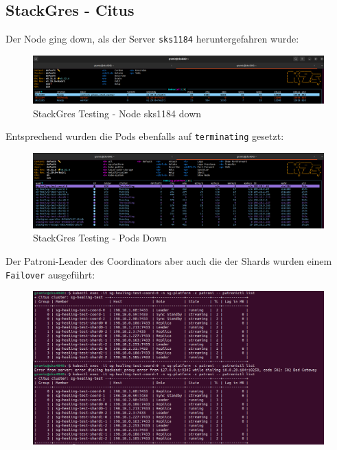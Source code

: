 
\begin{flushleft}
    \subsection{StackGres - Citus}
    \label{subsec:appendix_testing_stackgres_citus}
    Der Node ging down, als der Server \texttt{sks1184} heruntergefahren wurde:
    \begin{figure}[H]
        \centering
        \includegraphics[width=1\linewidth]{source/appendix/evaluation_testing/stackgres_node_sks1184_down}
        \caption{StackGres Testing - Node sks1184 down}
        \label{fig:stackgres_node_sks1184_down}
    \end{figure}
    Entsprechend wurden die Pods ebenfalls auf \texttt{terminating} gesetzt:
    \begin{figure}[H]
        \centering
        \includegraphics[width=1\linewidth]{source/appendix/evaluation_testing/stackgres_citus_testing_node_down}
        \caption{StackGres Testing - Pods Down}
        \label{fig:stackgres_citus_testing_node_down}
    \end{figure}
    Der Patroni-Leader des Coordinators aber auch die der Shards wurden einem \texttt{Failover} ausgeführt:
    \begin{figure}[H]
        \centering
        \includegraphics[width=1\linewidth]{source/appendix/evaluation_testing/stackgres_patroni_failover_overview}

\end{figure}
\end{flushleft}
